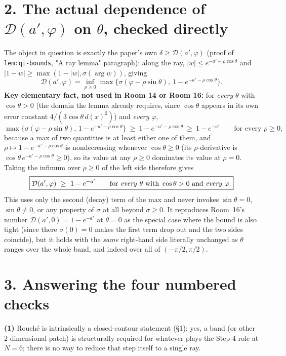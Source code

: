 \documentclass[11pt]{article}
\begin{document}
\section*{2. The actual dependence of $\mathcal D(a',\varphi)$ on $\theta$, checked directly}

The object in question is exactly the paper's own $\delta\ge\mathcal D(a',\varphi)$ (proof of
\texttt{lem:qi-bounds}, "A ray lemma" paragraph): along the ray, $|w|\le e^{-a'-\rho\cos\theta}$ and
$|1-w|\ge\max(1-|w|,\sigma(\arg w))$, giving
\[
\mathcal D(a',\varphi)=\inf_{\rho\ge0}\max\bigl\{\sigma(\varphi-\rho\sin\theta),\ 1-e^{-a'-\rho\cos\theta}\bigr\}.
\]
\textbf{Key elementary fact, not used in Room 14 or Room 16:} for \emph{every} $\theta$ with
$\cos\theta>0$ (the domain the lemma already requires, since $\cos\theta$ appears in its own error
constant $4/(3\cos\theta\,d(x)^2)$) and \emph{every} $\varphi$,
\[
\max\{\sigma(\varphi-\rho\sin\theta),\,1-e^{-a'-\rho\cos\theta}\}\ \ge\ 1-e^{-a'-\rho\cos\theta}
\ \ge\ 1-e^{-a'}\qquad\text{for every }\rho\ge0,
\]
because a max of two quantities is at least either one of them, and $\rho\mapsto1-e^{-a'-\rho\cos\theta}$
is nondecreasing whenever $\cos\theta\ge0$ (its $\rho$-derivative is $\cos\theta\, e^{-a'-\rho\cos\theta}
\ge0$), so its value at any $\rho\ge0$ dominates its value at $\rho=0$. Taking the infimum over
$\rho\ge0$ of the left side therefore gives
\[
\boxed{\mathcal D(a',\varphi)\ \ge\ 1-e^{-a'}\qquad\text{for \emph{every} }\theta\text{ with }\cos\theta>0\text{ and \emph{every} }\varphi.}
\]
This uses only the second (decay) term of the max and never invokes $\sin\theta=0$, $\sin\theta\ne0$,
or any property of $\sigma$ at all beyond $\sigma\ge0$. It reproduces Room~16's number
$\mathcal D(a',0)=1-e^{-a'}$ at $\theta=0$ as the special case where the bound is also tight (since
there $\sigma(0)=0$ makes the first term drop out and the two sides coincide), but it holds with the
\emph{same} right-hand side literally unchanged as $\theta$ ranges over the whole band, and indeed over
all of $(-\pi/2,\pi/2)$.

\section*{3. Answering the four numbered checks}

\textbf{(1)} Rouch\'e is intrinsically a closed-contour statement (\S1): yes, a band (or other
2-dimensional patch) is structurally required for whatever plays the Step-4 role at $N=6$; there is no
way to reduce that step itself to a single ray.
\end{document}

